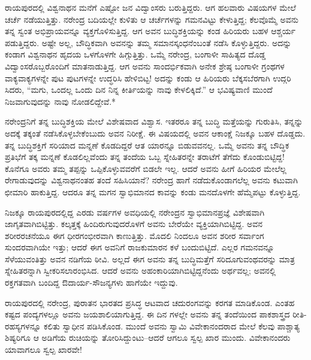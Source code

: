 ರಾಯಪುರದಲ್ಲಿ ವಿಶ್ವನಾಥನ ಮನೆಗೆ ಎಷ್ಟೋ ಜನ ವಿದ್ವಾಂಸರು ಬರುತ್ತಿದ್ದರು. ಆಗ ಹಲವಾರು ವಿಷಯಗಳ ಮೇಲೆ ಚರ್ಚೆ ನಡೆಯುತ್ತಿತ್ತು. ನರೇಂದ್ರ ಬದಿಯಲ್ಲೇ ಕುಳಿತು ಆ ಚರ್ಚೆಗಳನ್ನು ಗಮನವಿಟ್ಟು ಕೇಳುತ್ತಿದ್ದ; ಕೆಲವೊಮ್ಮೆ ಅವನು ತನ್ನ ಸ್ವಂತ ಅಭಿಪ್ರಾಯವನ್ನೂ ವ್ಯಕ್ತಗೊಳಿಸುತ್ತಿದ್ದ. ಆಗ ಅವನ ಬುದ್ಧಿಶಕ್ತಿಯನ್ನು ಕಂಡ ಹಿರಿಯರು ಬಹಳ ಆಶ್ಚರ್ಯ ಪಡುತ್ತಿದ್ದರು. ಅಷ್ಟೇ ಅಲ್ಲ, ಬೌದ್ಧಿಕವಾಗಿ ಅವನನ್ನು ತಮ್ಮ ಸಮಾನಸ್ಕಂಧನೆಂಬಂತೆ ನಡೆಸಿ ಕೊಳ್ಳುತ್ತಿದ್ದರು. ಅದನ್ನು ಕಂಡಾಗ ವಿಶ್ವನಾಥನ ಹೃದಯ ಒಳಗೊಳಗೇ ಹಿಗ್ಗುತ್ತಿತ್ತು. ಒಮ್ಮೆ ನರೇಂದ್ರ, ಬಂಗಾಳೀ ಸಾಹಿತ್ಯದ ದೊಡ್ಡ ವಿದ್ವಾಂಸರೊಬ್ಬರೊಂದಿಗೆ ಮಾತನಾಡುತ್ತಿದ್ದ. ಆಗ ಅವನು ಸಾಂದರ್ಭಿಕವಾಗಿ ಅನೇಕ ಶ್ರೇಷ್ಠ ಬಂಗಾಳೀ ಗ್ರಂಥಗಳ ವಾಕ್ಯವಾಕ್ಯಗಳನ್ನೇ ಪುಟ ಪುಟಗಳನ್ನೇ ಉದ್ಧರಿಸಿ ಹೇಳಿಬಿಟ್ಟ! ಅದನ್ನು ಕಂಡು ಆ ಹಿರಿಯರು ಬೆಕ್ಕಸಬೆರಗಾಗಿ ಉದ್ಗರಿ ಸಿದರು, “ಮಗು, ಒಂದಲ್ಲ ಒಂದು ದಿನ ನಿನ್ನ ಕೀರ್ತಿಯನ್ನು ನಾವು ಕೇಳಲಿಕ್ಕಿದೆ.” ಆ ಭವಿಷ್ಯವಾಣಿ ಮುಂದೆ ನಿಜವಾಗುವುದನ್ನು ನಾವು ನೋಡಲಿದ್ದೇವೆ.*

ನರೇಂದ್ರನಿಗೆ ತನ್ನ ಬುದ್ಧಿಶಕ್ತಿಯ ಮೇಲೆ ವಿಶೇಷವಾದ ವಿಶ್ವಾಸ. ಇತರರೂ ತನ್ನ ಬುದ್ಧಿ ಮತ್ತೆಯನ್ನು ಗುರುತಿಸಿ, ತನ್ನನ್ನು ಅದಕ್ಕೆ ತಕ್ಕಂತೆ ನಡೆಸಿಕೊಳ್ಳಬೇಕೆಂಬುದು ಅವನ ನಿರೀಕ್ಷೆ. ಈ ವಿಷಯದಲ್ಲಿ ಅವನ ಆಕಾಂಕ್ಷೆ ನಿಜಕ್ಕೂ ಬಹಳ ದೊಡ್ಡದು. ತನ್ನ ಬುದ್ಧಿಶಕ್ತಿಗೆ ಸರಿಯಾದ ಮನ್ನಣೆ ಕೊಡದಿದ್ದರೆ ಆತ ಯಾರನ್ನೂ ಬಿಡುವವನಲ್ಲ. ಒಮ್ಮೆ ಅವನು ತನ್ನ ಬೌದ್ಧಿಕ ಪ್ರತಿಭೆಗೆ ತಕ್ಕ ಮನ್ನಣೆ ಕೊಡಲಿಲ್ಲವೆಂದು ತನ್ನ ತಂದೆಯ ಒಬ್ಬ ಸ್ನೇಹಿತರನ್ನೇ ತರಾಟೆಗೆ ತೆಗೆದು ಕೊಂಡುಬಿಟ್ಟಿದ್ದ! ಕೊನೆಗೂ ಅವರು ತಮ್ಮ ತಪ್ಪನ್ನು ಒಪ್ಪಿಕೊಳ್ಳುವವರೆಗೆ ಬಿಡಲೇ ಇಲ್ಲ. ಆದರೆ ಅವನು ಹೀಗೆ ಹಿರಿಯರ ಮೇಲೆಲ್ಲ ರೇಗಾಡುವುದನ್ನು ವಿಶ್ವನಾಥನಂತಹ ತಂದೆ ಸಹಿಸಿಯಾನೆ? ನರೇಂದ್ರ ಹಾಗೆ ನಡೆದುಕೊಂಡಾಗಲೆಲ್ಲ ಅವನು ಕಟುವಾಗಿ ಛೀಮಾರಿ ಹಾಕುತ್ತಿದ್ದ. ಆದರೂ ತನ್ನ ಮಗನ ಸ್ವಾಭಿಮಾನದ ಕಾವನ್ನು ಕಂಡು ಮನದೊಳಗೇ ಹೆಮ್ಮೆಪಟ್ಟು ಕೊಳ್ಳುತ್ತಿದ್ದ.

ನಿಜಕ್ಕೂ ರಾಯಪುರದಲ್ಲಿದ್ದ ಎರಡು ವರ್ಷಗಳ ಅವಧಿಯಲ್ಲಿ ನರೇಂದ್ರನ ಸ್ವಾಭಿಮಾನಪ್ರಜ್ಞೆ ವಿಶೇಷವಾಗಿ ಜಾಗೃತವಾಗಿಬಿಟ್ಟಿತ್ತು. ಕಲ್ಕತ್ತಕ್ಕೆ ಹಿಂದಿರುಗುವುದರೊಳಗೆ ಅವನು ಬೇರೆಯೇ ವ್ಯಕ್ತಿಯಾಗಿಬಿಟ್ಟಿದ್ದ. ಅವನ ಶರೀರರಚನೆಯೂ ಈಗ ಧೀರಗಂಭೀರವಾಗಿ ಕಾಣುತ್ತಿತ್ತು. ಮೊದಲಿ ನಿಂದಲೂ ಅವನ ಶರೀರ ಸರ್ವಾಂಗ ಸುಂದರವಾಗಿಯೇ ಇತ್ತು; ಆದರೆ ಈಗ ಅವನಿಗೆ ರಾಜಕುಮಾರನ ಕಳೆ ಬಂದುಬಿಟ್ಟಿದೆ. ಎಲ್ಲರ ಗಮನವನ್ನೂ ಸೆಳೆಯುವಂತಿತ್ತು ಅವನ ನಡಿಗೆಯ ಠೀವಿ. ಅಲ್ಲದೆ ಈಗ ಅವನು ತನ್ನ ಬುದ್ಧಿಮತ್ತೆಗೆ ಸರಿದೂಗುವಂಥವರನ್ನು ಮಾತ್ರ ಸ್ನೇಹಿತರನ್ನಾಗಿ ಸ್ವೀಕರಿಸಲಾರಂಭಿಸಿದ. ಆದರೆ ಅವನು ಅಹಂಕಾರಿಯಾಗಿಬಿಟ್ಟಿದ್ದನೆಂದು ಅರ್ಥವಲ್ಲ; ಅವನಲ್ಲಿ ರಕ್ತಗತವಾಗಿ ಬಂದಿದ್ದ ಔದಾರ್ಯ-ಸೌಜನ್ಯಗಳು ಹಾಗೆಯೇ ಇದ್ದುವು.

ರಾಯಪುರದಲ್ಲಿ ನರೇಂದ್ರ, ಪುರಾತನ ಭಾರತದ ಪ್ರಸಿದ್ಧ ಆಟವಾದ ಚದುರಂಗವನ್ನು ಕರಗತ ಮಾಡಿಕೊಂಡ. ಎಂತಹ ಕಷ್ಟದ ಪಂದ್ಯಗಳಲ್ಲೂ ಅವನು ಜಯಶಾಲಿಯಾಗುತ್ತಿದ್ದ. ಈ ದಿನ ಗಳಲ್ಲೇ ಅವನು ತನ್ನ ತಂದೆಯಿಂದ ಪಾಕಶಾಸ್ತ್ರದ ರೀತಿ-ರಹಸ್ಯಗಳನ್ನೂ ಕಲಿತು ಸ್ವಾಧೀನ ಪಡಿಸಿಕೊಂಡ. ಮುಂದೆ ಅವನು ಸ್ವಾಮಿ ವಿವೇಕಾನಂದರಾದ ಮೇಲೆ ಕೆಲವು ಪಾಶ್ಚಾತ್ಯ ಶಿಷ್ಯರಿಗೂ ಆ ಅಡಿಗೆಯ ರುಚಿಯನ್ನು ತೋರಿಸಿದ್ದುಂಟು–ಆದರೆ ಆಗಲೂ ಸ್ವಲ್ಪ ಖಾರ ಮುಂದು. ವಿವೇಕಾನಂದರು ಯಾವಾಗಲೂ ಸ್ವಲ್ಪ ಖಾರವೇ!


